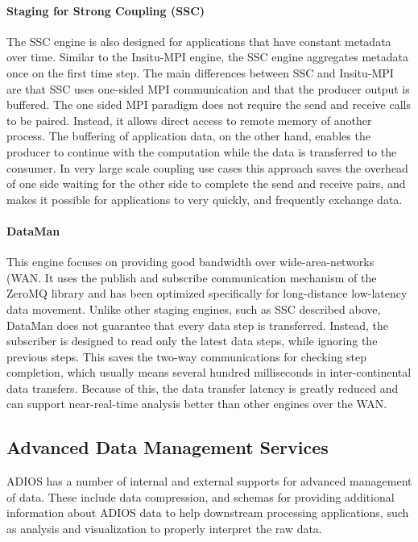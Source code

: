 \documentclass[x11names,table,xcdraw,graybox]{svmult}
\begin{document}
\paragraph{\textbf{Staging for Strong Coupling (SSC)}}
The SSC engine is also designed for applications that have constant metadata over time. Similar to the Insitu-MPI engine, the SSC engine aggregates metadata once on the first time step. The main differences between SSC and Insitu-MPI are that SSC uses one-sided MPI communication and that the producer output is buffered.
The one sided MPI paradigm does not require the send and receive calls to be paired. Instead, it allows direct access to remote memory of another process. The buffering of application data, on the other hand, enables the producer to continue with the computation while the data is transferred to the consumer.
In very large scale coupling use cases this approach saves the overhead of one side waiting for the other side to complete the send and receive pairs, and makes it possible for applications to very quickly, and frequently exchange data.


\paragraph{\textbf{DataMan}}
This engine focuses on providing good bandwidth over wide-area-networks (WAN. It uses the publish and subscribe communication mechanism of the ZeroMQ library and has been optimized specifically for long-distance low-latency data movement. Unlike other staging engines, such as SSC described above, DataMan does not guarantee that every data step is transferred. Instead, the subscriber is designed to read only the latest data steps, while ignoring the previous steps. This saves the two-way communications for checking step completion, which usually means several hundred milliseconds in inter-continental data transfers. Because of this, the data transfer latency is greatly reduced and can support near-real-time analysis better than other engines over the WAN.

\subsection{Advanced Data Management Services}
\label{sec:adios:advanced}
ADIOS has a number of internal and external supports for advanced management of data. These include data compression, and schemas for providing additional information about ADIOS data to help downstream processing applications, such as analysis and visualization to properly interpret the raw data.
\end{document}
